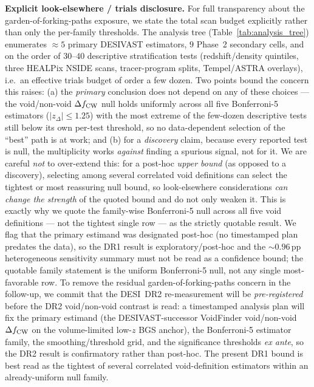 \documentclass[aps,prd,twocolumn,superscriptaddress,showpacs,preprintnumbers,nofootinbib,longbibliography,floatfix]{revtex4-2}
\begin{document}
\textbf{Explicit look-elsewhere / trials disclosure.} For full
transparency about the garden-of-forking-paths exposure, we state the
total scan budget explicitly rather than only the per-family thresholds.
The analysis tree (Table~\ref{tab:analysis_tree}) enumerates $\approx\!5$
primary DESIVAST estimators, $9$ Phase~2 secondary cells, and on the order
of $30$--$40$ descriptive stratification tests (redshift/density
quintiles, three HEALPix NSIDE scans, tracer-program splits, Tempel/ASTRA
overlays), i.e.\ an effective trials budget of order a few dozen. Two
points bound the concern this raises: (a) the \emph{primary} conclusion
does not depend on any of these choices --- the void/non-void
$\Delta f_{\rm CW}$ null holds uniformly across all five Bonferroni-5
estimators ($|z_\Delta|\!\le\!1.25$) with the most extreme of the few-dozen
descriptive tests still below its own per-test threshold, so no
data-dependent selection of the ``best'' path is at work; and (b) for a
\emph{discovery} claim, because every reported test is null, the
multiplicity works \emph{against} finding a spurious signal, not for it.
We are careful \emph{not} to over-extend this: for a post-hoc
\emph{upper bound} (as opposed to a discovery), selecting among several
correlated void definitions can select the tightest or most reassuring
null bound, so look-elsewhere considerations \emph{can change the
strength} of the quoted bound and do not only weaken it. This is exactly
why we quote the family-wise Bonferroni-5 null across all five void
definitions --- not the tightest single row --- as the strictly quotable
result. We flag that the primary estimand was designated post-hoc (no
timestamped plan predates the data), so the DR1 result is
exploratory/post-hoc and the ${\sim}0.96$\,pp heterogeneous sensitivity
summary must not be read as a confidence bound;
the quotable family statement is the uniform Bonferroni-5 null,
not any single most-favorable row. To remove the residual
garden-of-forking-paths concern in the follow-up, we commit that the
DESI~DR2 re-measurement will be \emph{pre-registered} before the DR2
void/non-void contrast is read: a timestamped analysis plan will fix the
primary estimand (the DESIVAST-successor VoidFinder void/non-void
$\Delta f_{\rm CW}$ on the volume-limited low-$z$ BGS anchor), the
Bonferroni-5 estimator family, the smoothing/threshold grid, and the
significance thresholds \emph{ex ante}, so the DR2 result is confirmatory
rather than post-hoc. The present DR1 bound is best read as the tightest of
several correlated void-definition estimators within an already-uniform
null family.
\end{document}
